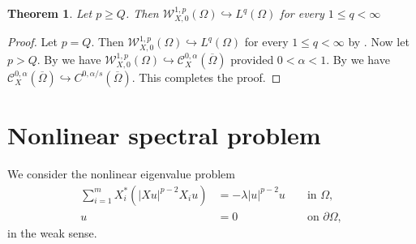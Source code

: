\documentclass[a4paper,12pt,reqno]{amsart}
\numberwithin{equation}{section}
\theoremstyle{plain}
\newtheorem{theorem}{Theorem}[section]
\theoremstyle{definition}
\begin{document}
\begin{theorem}\label{continuous Sobolev embedding for p>Q}
Let $p\geq Q$. Then $\mathcal{W}_{X,0}^{1, p}(\Omega)\hookrightarrow L^{q}(\Omega)$   for every $1\leq q < \infty$  
\end{theorem}
\begin{proof}
Let $p=Q$. Then  $\mathcal{W}_{X,0}^{1, p}(\Omega)\hookrightarrow L^{q}(\Omega)$   for every $1\leq q < \infty$ by \cite[Remark 1.1]{chen2024sharp}. Now let $p>Q$. By \cite[Remark 1.1]{chen2024sharp} we have $\mathcal{W}_{X,0}^{1, p}(\Omega)\hookrightarrow \mathcal{C}^{0, \alpha}_{X}(\overline{\Omega})$ provided $0<\alpha<1$. By \cite[Proposition 2.14]{bramanti2023hormander} we have $\mathcal{C}^{0, \alpha}_{X}(\overline{\Omega})\hookrightarrow C^{0,\alpha/s}(\overline{\Omega})$. This completes the proof.
\end{proof}


\section{Nonlinear spectral problem}\label{sec3}
We consider the nonlinear eigenvalue problem
\begin{equation}\label{eigenvalue problem}
\begin{aligned}
\sum_{i=1}^{m}X_{i}^{*}\left(\left|X u\right|^{p-2} X_{i}u\right)&=-\lambda|u|^{p-2} u  &&\text { in } \Omega, \\
u&=0
&&\text { on } \partial \Omega,
\end{aligned}
\end{equation}
in the weak  sense.
\end{document}
